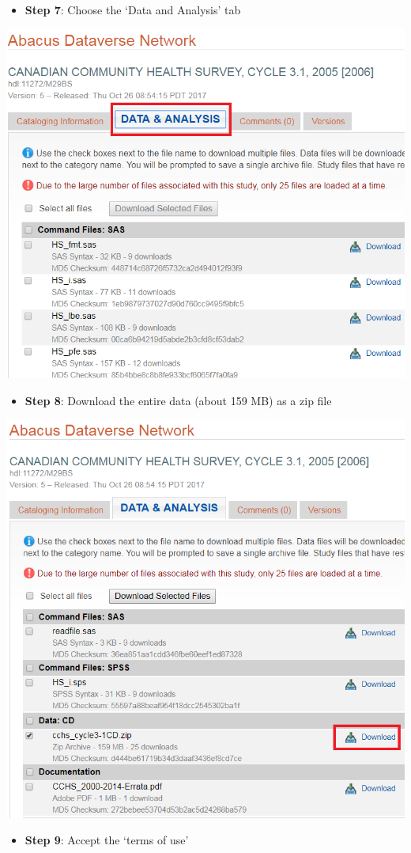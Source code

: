 \documentclass[
]{book}
\providecommand{\tightlist}{%
  \setlength{\itemsep}{0pt}\setlength{\parskip}{0pt}}
\begin{document}
\begin{itemize}
\tightlist
\item
  \textbf{Step 7}: Choose the `Data and Analysis' tab
\end{itemize}

\includegraphics[width=0.65\linewidth]{images/abacus7}

\begin{itemize}
\tightlist
\item
  \textbf{Step 8}: Download the entire data (about 159 MB) as a zip file
\end{itemize}

\includegraphics[width=0.65\linewidth]{images/abacus8}

\begin{itemize}
\tightlist
\item
  \textbf{Step 9}: Accept the `terms of use'
\end{itemize}
\end{document}
